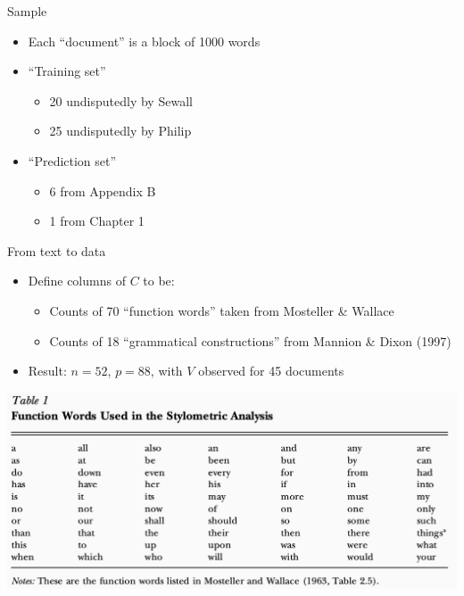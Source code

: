 \documentclass[english]{beamer}
\begin{document}
\begin{frame}{Sample}
\begin{itemize}
\setlength{\itemsep}{1.5em}
\item Each ``document'' is a block of 1000 words 
\item ``Training set''
    \vspace{5pt}
\begin{itemize}
\setlength{\itemsep}{0.4em}
\item 20 undisputedly by Sewall
\item 25 undisputedly by Philip
    \end{itemize}
    \item ``Prediction set''
        \vspace{5pt}
    \begin{itemize}
        \item 6 from Appendix B
        \item 1 from Chapter 1
    \end{itemize}
\end{itemize}
\end{frame}

\begin{frame}{From text to data}
\begin{itemize}
\setlength{\itemsep}{1.4em}
\item Define columns of $C$ to be:
        \vspace{5pt}
\begin{itemize}
\setlength{\itemsep}{0.4em}
\item Counts of 70 ``function words'' taken from Mosteller \& Wallace
\item Counts of 18 ``grammatical constructions'' from Mannion \& Dixon (1997)
\end{itemize}
\item Result: $n = 52$, $p = 88$, with $V$ observed for 45 documents
\end{itemize}
\end{frame}

\begin{frame}{}
\centering
\includegraphics[width=1 \textwidth]{Images/fischer_table1.png}
\end{frame}
\end{document}
